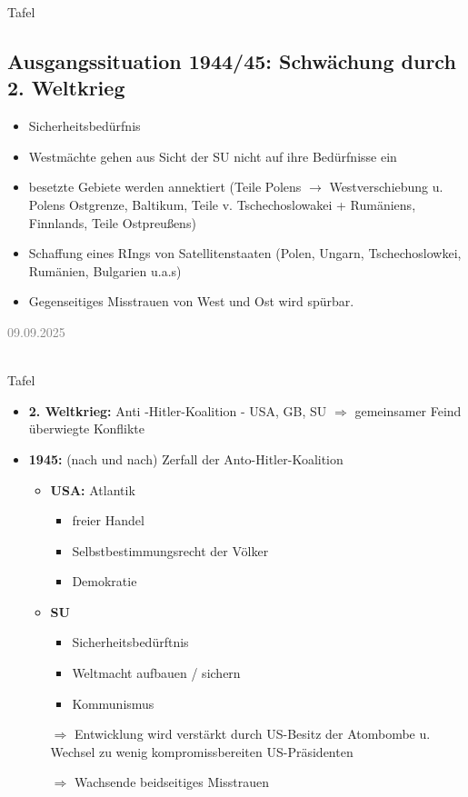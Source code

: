 \documentclass[11pt,a4paper,oneside]{article}
\newcommand{\lessondate}[1]{
	\noindent\hfill\textcolor{gray}{\textsc{#1}} \\
	\vspace{0.5cm}
}
\begin{document}
	
	\newpage
	
	\begin{histloesung}{Tafel}
		\subsection*{Ausgangssituation 1944/45: Schwächung durch 2. Weltkrieg}
		\begin{itemize}
			\item Sicherheitsbedürfnis
			\item Westmächte gehen aus Sicht der SU nicht auf ihre Bedürfnisse ein
			\item besetzte Gebiete werden annektiert (Teile Polens $\rightarrow$ Westverschiebung u. Polens Ostgrenze, Baltikum, Teile v. Tschechoslowakei + Rumäniens, Finnlands, Teile Ostpreußens)
			\item Schaffung eines RIngs von Satellitenstaaten (Polen, Ungarn, Tschechoslowkei, Rumänien, Bulgarien u.a.s)
			\item Gegenseitiges Misstrauen von West und Ost wird spürbar.
		\end{itemize}
	\end{histloesung}
	
	\lessondate{09.09.2025}\\
	
	\begin{histloesung}{Tafel}
		\begin{itemize}
			\item \textbf{2. Weltkrieg:} Anti -Hitler-Koalition - USA, GB, SU $\Rightarrow$ gemeinsamer Feind überwiegte Konflikte
			\item \textbf{1945:} (nach und nach) Zerfall der Anto-Hitler-Koalition 
			\begin{itemize}
				\item \textbf{USA:} Atlantik
				\begin{itemize}
					\item freier Handel 
					\item Selbstbestimmungsrecht der Völker 
					\item Demokratie
				\end{itemize}
				\item \textbf{SU}
				\begin{itemize}
					\item Sicherheitsbedürftnis
					\item Weltmacht aufbauen / sichern 
					\item Kommunismus
				\end{itemize}
				\item [$\Rightarrow$] Entwicklung wird verstärkt durch US-Besitz der Atombombe u. Wechsel zu wenig kompromissbereiten US-Präsidenten 
				\item [$\Rightarrow$] Wachsende beidseitiges Misstrauen
			\end{itemize} 
		\end{itemize}
	\end{histloesung}
	
\end{document}
